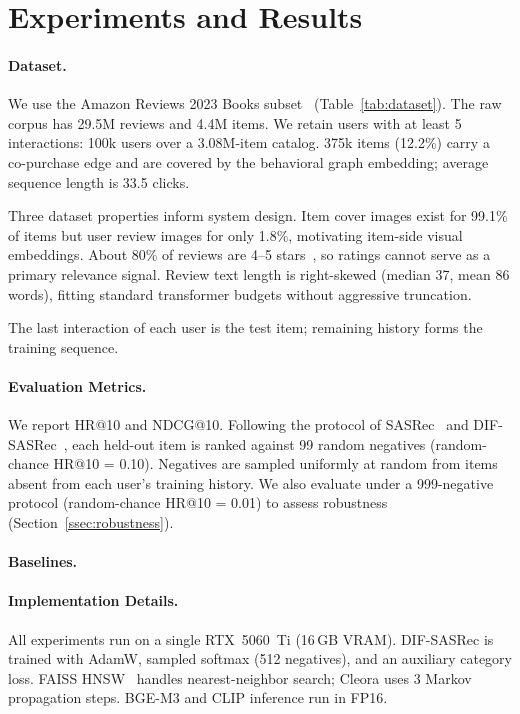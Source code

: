 \section{Experiments and Results}
\label{sec:exp}

\paragraph{Dataset.}
We use the Amazon Reviews 2023 Books subset~\cite{hou2024amazon}
(Table~\ref{tab:dataset}).
The raw corpus has 29.5M reviews and 4.4M items.
We retain users with at least 5 interactions: 100k users over a 3.08M-item
catalog. 375k items (12.2\%) carry a co-purchase edge and are covered by the
behavioral graph embedding; average sequence length is 33.5 clicks.



Three dataset properties inform system design.
Item cover images exist for 99.1\% of items but user review images for only
1.8\%, motivating item-side visual embeddings.
About 80\% of reviews are 4--5 stars~\cite{hou2024amazon}, so ratings cannot
serve as a primary relevance signal.
Review text length is right-skewed (median 37, mean 86 words), fitting
standard transformer budgets without aggressive truncation.

The last interaction of each user is the test item; remaining history forms
the training sequence.

\paragraph{Evaluation Metrics.}
We report HR@10 and NDCG@10.
Following the protocol of SASRec~\cite{kang2018self} and
DIF-SASRec~\cite{xie2022difsr}, each held-out item is ranked against 99 random
negatives (random-chance HR@10 = 0.10).
Negatives are sampled uniformly at random from items absent from each user's
training history.
We also evaluate under a 999-negative protocol (random-chance HR@10 = 0.01)
to assess robustness (Section~\ref{ssec:robustness}).

\paragraph{Baselines.}


\paragraph{Implementation Details.}
All experiments run on a single RTX~5060~Ti (16\,GB VRAM).
DIF-SASRec is trained with AdamW, sampled softmax (512 negatives),
and an auxiliary category loss.
FAISS HNSW~\cite{malkov2018efficient} handles nearest-neighbor search;
Cleora uses 3 Markov propagation steps.
BGE-M3 and CLIP inference run in FP16.
